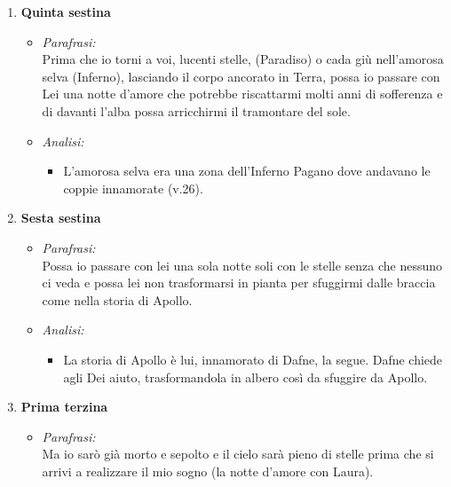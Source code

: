 \documentclass{article}
\begin{document}
\begin{enumerate}
\begin{enumerate}[label=]
\begin{itemize}[label=]
\begin{itemize}
                        \end{itemize}
                \end{itemize}
            \item \textbf{Quinta sestina}
                \begin{itemize}[label=]
                    \item \textit{Parafrasi:}\\
                        Prima che io torni a voi, lucenti stelle, (Paradiso) o cada giù nell'amorosa selva (Inferno), lasciando il corpo ancorato in Terra, possa io passare con Lei una notte d'amore che potrebbe riscattarmi molti anni di sofferenza e di davanti l'alba possa arricchirmi il tramontare del sole.
                    \item \textit{Analisi:}
                        \begin{itemize}
                            \item L'amorosa selva era una zona dell'Inferno Pagano dove andavano le coppie innamorate (v.26).
                        \end{itemize}
                \end{itemize}
            \item \textbf{Sesta sestina}
                \begin{itemize}[label=]
                    \item \textit{Parafrasi:}\\
                        Possa io passare con lei una sola notte soli con le stelle senza che nessuno ci veda e possa lei non trasformarsi in pianta per sfuggirmi dalle braccia come nella storia di Apollo.
                    \item \textit{Analisi:}
                        \begin{itemize}
                            \item La storia di Apollo è lui, innamorato di Dafne, la segue. Dafne chiede agli Dei aiuto, trasformandola in albero così da sfuggire da Apollo.
                        \end{itemize}
                \end{itemize}
            \item \textbf{Prima terzina}
                \begin{itemize}[label=]
                    \item \textit{Parafrasi:}\\
                        Ma io sarò già morto e sepolto e il cielo sarà pieno di stelle prima che si arrivi a realizzare il mio sogno (la notte d'amore con Laura).

\end{itemize}
\end{enumerate}
\end{enumerate}
\end{document}
